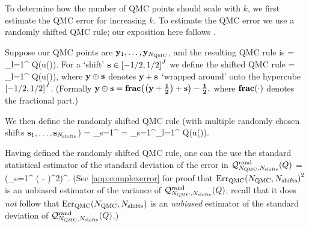     To determine how the number of QMC points should scale with $k$, we first estimate the QMC error for increasing $k.$ To estimate the QMC error we use a randomly shifted QMC rule; our exposition here follows \cite[Section 4.2]{GrKuNuScSl:11}.

    Suppose our QMC points are $\mathbf{y}_{1},\ldots,\mathbf{y}_{N_{\mathrm{QMC}}}$, and the resulting QMC rule is
    \beqs
{} = \sum_{l=1}^{\NQMC} Q\mleft(u\mleft(\byl\mright)\mright).
\eeqs
For a `shift' $\shift \in \cube{J}$ we define the shifted QMC rule
\beqs
{} = \sum_{l=1}^{\NQMC} Q\mleft(u\mleft(\byl\oplus\shift\mright)\mright),
\eeqs
where $\mathbf{y} \oplus \mathbf{s}$ denotes $\mathbf{y} + \mathbf{s}$ `wrapped around' onto the hypercube $\cube{J}$. (Formally $\by \oplus \shift = \fracoperator{\mleft(\by + \bhalf\mright)+\shift} - \bhalf,$ where $\fracoperator{\cdot}$ denotes the fractional part.)

We then define the randomly shifted QMC rule (with multiple randomly chosen shifts $\mathbf{s}_{1},\ldots,\mathbf{s}_{N_{\mathrm{shifts}}}$)
\beqs
{} = \sum_{s=1}^{\Nshifts}  = \sum_{s=1}^{\Nshifts}\sum_{l=1}^{\NQMC} Q\mleft(u\mleft(\byl\oplus \shifts\mright)\mright).
\eeqs

Having defined the randomly shifted QMC rule, one can the use the standard statistical estimator of the standard deviation of the error in $\QMCrandshift{Q}{\Nshifts}$ \cite[Equation (4.6)]{GrKuNuScSl:11}
\beqs
\QMCerror{\NQMC}{\Nshifts} = \mleft(\sum_{s=1}^{\Nshifts} \mleft( - \mright)^2\mright)^{\half}.
\eeqs
(See \cref{app:complexerror} for proof that $\QMCerror{\NQMC}{\Nshifts}^2$ is an unbiased estimator of the variance of $\QMCrandshift{Q}{\Nshifts}$; recall that it does \emph{not} follow that $\QMCerror{\NQMC}{\Nshifts}$ is an \emph{unbiased} estimator of the standard deviation of $\QMCrandshift{Q}{\Nshifts}$.)

